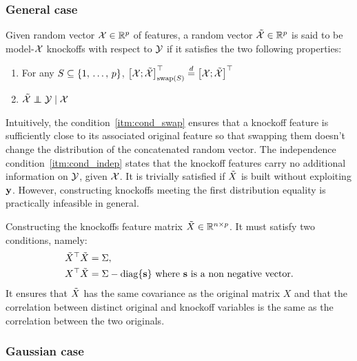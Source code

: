 \subsubsection{General case}

\begin{definition}
    Given random vector $\mathcal{X} \in \mathbb{R}^p$ of features,
    a random vector $\tilde{\mathcal{X}} \in \mathbb{R}^p$ is said to be model-$\mathcal{X}$ knockoffs with respect to $\mathcal{Y}$
    if it satisfies the two following properties:
    \begin{enumerate}[label=\textbf{S.\arabic*},ref=S.\arabic*]
        \item \label{itm:cond_swap} For any $S \subseteq \left\{ 1,\, \dots,\, p \right\}$,
            $\big[ \mathcal{X}; \tilde{\mathcal{X}} \big]^\top_{\operatorname{swap}(S)} \stackrel{d}{=} \big[ \mathcal{X}; \tilde{\mathcal{X}} \big]^\top$
        \item \label{itm:cond_indep} $\tcX \independent \cY \mid \cX$
    \end{enumerate}
\end{definition}
Intuitively, the condition~\ref{itm:cond_swap} ensures that a knockoff feature is sufficiently
close to its associated original feature so that swapping them doesn't change the distribution of the
concatenated random vector.
The independence condition~\ref{itm:cond_indep} states that the knockoff features
carry no additional information on $\mathcal{Y}$, given $\mathcal{X}$.
It is trivially satisfied if $\tilde{X}$ is built without exploiting $\mathbf{y}$.
However, constructing knockoffs meeting the first distribution equality is practically infeasible in general.
\begin{remark}
    Constructing the knockoffs feature matrix $\tilde{X} \in \mathbb{R}^{n \times p}$.
    It must satisfy two conditions, namely:
    \begin{align*}
        &{\tilde{X}}^\top\tilde{X} = \Sigma,
        \\
        &X^\top\tilde{X} = \Sigma - \operatorname*{diag}\{\mathbf{s}\}
        \text{ where } \mathbf{s} \text{ is a non negative vector.}
    \end{align*}
    It ensures that $\tilde{X}$ has the same covariance as the original matrix $X$
    and that the correlation between distinct original and knockoff variables is
    the same as the correlation between the two originals.
\end{remark}

\subsubsection{Gaussian case}\label{subsubsec:gaussian_knockoffs}

